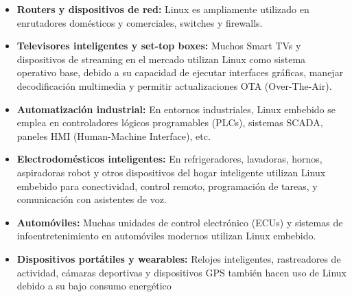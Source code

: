 \documentclass[12pt, letterpaper]{article}
\begin{document}
	\begin{itemize}
		\item \textbf{Routers y dispositivos de red:} Linux es ampliamente utilizado en enrutadores domésticos y comerciales, switches y firewalls. %

		\item \textbf{Televisores inteligentes y set-top boxes:} Muchos Smart TVs y dispositivos de streaming en el mercado utilizan Linux como sistema operativo base, debido a su capacidad de ejecutar interfaces gráficas, manejar decodificación multimedia y permitir actualizaciones OTA (Over-The-Air). %

		\item \textbf{Automatización industrial:} En entornos industriales, Linux embebido se emplea en controladores lógicos programables (PLCs), sistemas SCADA, paneles HMI (Human-Machine Interface), etc. %

		\item \textbf{Electrodomésticos inteligentes:} En refrigeradores, lavadoras, hornos, aspiradoras robot y otros dispositivos del hogar inteligente utilizan Linux embebido para conectividad, control remoto, programación de tareas, y comunicación con asistentes de voz. %

		\item \textbf{Automóviles:} Muchas unidades de control electrónico (ECUs) y sistemas de infoentretenimiento en automóviles modernos utilizan Linux embebido. %

		\item \textbf{Dispositivos portátiles y wearables:} Relojes inteligentes, rastreadores de actividad, cámaras deportivas y dispositivos GPS también hacen uso de Linux debido a su bajo consumo energético %
	\end{itemize}
\end{document}
